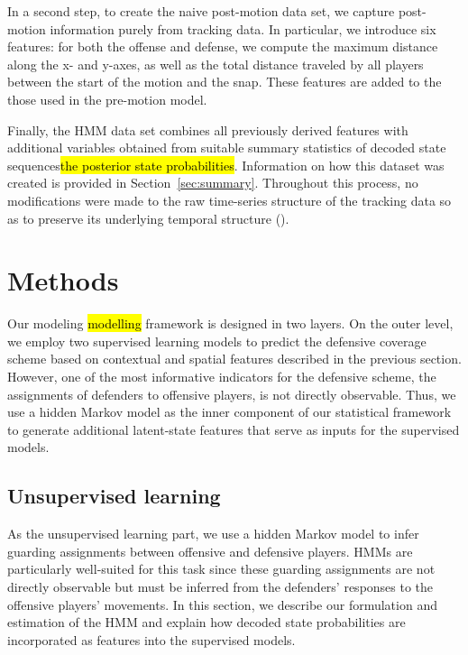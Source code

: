 \documentclass[namedate,webpdf,modern,medium]{oup-authoring-template}
\providecommand{\DIFadd}[1]{\ifmmode{#1}\else\hl{#1}\fi} %
\providecommand{\DIFdel}[1]{{\protect\color{red}#1}} %
\providecommand{\DIFaddbegin}{} %
\providecommand{\DIFaddend}{} %
\providecommand{\DIFdelbegin}{} %
\providecommand{\DIFdelend}{} %
\begin{document}
In a second step, to create the naive post-motion data set, we capture post-motion information purely from tracking data. In particular, we introduce six features: for both the offense and defense, we compute the maximum distance along the x- and y-axes, as well as the total
distance traveled by all players between the start of the motion and the snap. These features are added to \DIFdelbegin \DIFdel{the }\DIFdelend those used in the pre-motion model.

Finally, the HMM data set combines all previously derived features with additional variables obtained from suitable summary statistics of \DIFdelbegin \DIFdel{decoded state sequences}\DIFdelend \DIFaddbegin \DIFadd{the posterior state probabilities}\DIFaddend . Information on how this dataset was created is provided in Section~\ref{sec:summary}. Throughout this process, no modifications were made to the raw time-series structure of the tracking data so as to preserve its underlying temporal structure (\citealp{michels2024combination}).

\section{Methods}\label{sec:methods}

Our \DIFdelbegin \DIFdel{modeling }\DIFdelend \DIFaddbegin \DIFadd{modelling }\DIFaddend framework is designed in two layers. On the outer level, we employ two supervised learning models to predict the defensive coverage scheme based on contextual and spatial features described in the previous section. However, one of the most informative indicators for the defensive scheme, the assignments of defenders to offensive players, is not directly observable. Thus, we use a hidden Markov model as the inner component of our statistical framework to generate additional latent-state features that serve as inputs for the supervised models.

\subsection{Unsupervised learning}
As the unsupervised learning part, we use a hidden Markov model to infer guarding assignments between offensive and defensive players. HMMs are particularly well-suited for this task since these guarding assignments are not directly observable but must be inferred from the defenders' responses to the offensive players' movements. 
In this section, we describe our formulation and estimation of the HMM and explain how decoded state probabilities are incorporated as features into the supervised models.
\end{document}
